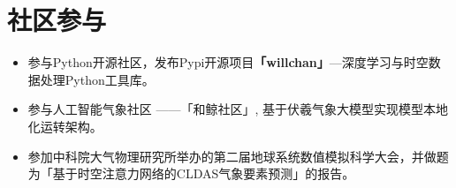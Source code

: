 \documentclass{resume}
\begin{document}
\vspace{0.2cm}
\section{社区参与}
\begin{itemize}[parsep=0.2ex]
  \item 参与Python开源社区，发布Pypi开源项目\textbf{「willchan」}—深度学习与时空数据处理Python工具库。
  \item 参与人工智能气象社区 ——「和鲸社区」, 基于伏羲气象大模型实现模型本地化运转架构。
  \item 参加中科院大气物理研究所举办的第二届地球系统数值模拟科学大会，并做题为「基于时空注意力网络的CLDAS气象要素预测」的报告。
\end{itemize}

%
%
\end{document}
